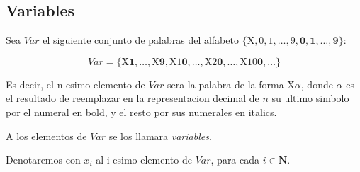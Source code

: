 \subsection{Variables}

\begin{definition}
Sea $Var$ el siguiente conjunto de palabras del alfabeto 
$\{\text{X}, \mathit{0}, \mathit{1}, \dots, \mathit{9}, \mathbf{0}, \mathbf{1}, \dots, \mathbf{9}\}$:

$$
Var = \{\text{X}\mathbf{1}, \dots, \text{X}\mathbf{9}, \text{X}\mathit{1}\mathbf{0}, \dots, \text{X}\mathit{2}\mathbf{0}, \dots, \text{X}\mathit{10}\mathbf{0}, \dots\}
$$

Es decir, el n-esimo elemento de $Var$ sera la palabra de la forma $\text{X}\alpha$, donde $\alpha$ es el resultado de reemplazar en 
la representacion decimal de $n$ su ultimo simbolo por el numeral en bold, y el resto por sus numerales en italics.

A los elementos de $Var$ se los llamara \emph{variables}.

Denotaremos con $x_i$ al i-esimo elemento de $Var$, para cada $i \in \mathbf{N}$.
\end{definition}


